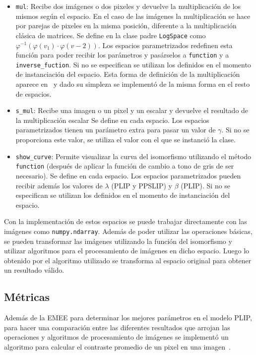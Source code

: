 \begin{itemize}
	\item \verb|mul|: Recibe dos im\'agenes o dos pixeles y devuelve la multiplicaci\'on de los mismos seg\'un el espacio. En el caso de las im\'agenes la multiplicaci\'on se hace por parejas de pixeles en la misma posici\'on, diferente a la multiplicaci\'on cl\'asica de matrices. Se define en la clase padre \verb|LogSpace| como $\varphi^{-1}(\varphi(v_1)\cdot\varphi(v-2))$. Los espacios parametrizados redefinen esta funci\'on para poder recibir los par\'ametros y pas\'arselos a \verb|function| y a \verb|inverse_fuction|. Si no se especifican se utilizan los definidos en el momento de instanciaci\'on del espacio. Esta forma de definici\'on de la multiplicaci\'on aparece en~\cite{panetta2010parameterized} y dado su simpleza se implement\'o de la misma forma en el resto de espacios.
	\item \verb|s_mul|: Recibe una imagen o un pixel y un escalar y devuelve el resultado de la multiplicaci\'on escalar Se define en cada espacio. Los espacios parametrizados tienen un par\'ametro extra para pasar un valor de $\gamma$. Si no se proporciona este valor, se utiliza el valor con el que se instanci\'o la clase.
	\item \verb|show_curve|: Permite visualizar la curva del isomorfismo utilizando el m\'etodo \verb|function| (despu\'es de aplicar la funci\'on de cambio a tono de gris de ser necesario). Se define en cada espacio. Los espacios parametrizados pueden recibir adem\'as los valores de $\lambda$ (PLIP y PPSLIP) y $\beta$ (PLIP). Si no se especifican se utilizan los definidos en el momento de instanciaci\'on del espacio.
\end{itemize}

Con la implementaci\'on de estos espacios se puede trabajar directamente con las im\'agenes como \verb|numpy.ndarray|. Adem\'as de poder utilizar las operaciones b\'asicas, se pueden transformar las im\'agenes utilizando la funci\'on del isomorfismo y utilizar algoritmos para el procesamiento de im\'agenes en dicho espacio. Luego lo obtenido por el algoritmo utilizado se transforma al espacio original para obtener un resultado v\'alido.

\subsection{M\'etricas}

Adem\'as de la EMEE para determinar los mejores par\'ametros en el modelo PLIP, para hacer una comparaci\'on entre las diferentes resultados que arrojan las operaciones y algoritmos de procesamiento de im\'agenes se implement\'o un algoritmo para calcular el contraste promedio de un pixel en una imagen~\cite{patrascu2014mathematical}.

